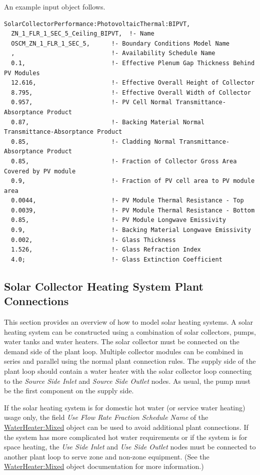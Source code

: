 An example input object follows.


\begin{lstlisting}
SolarCollectorPerformance:PhotovoltaicThermal:BIPVT,
  ZN_1_FLR_1_SEC_5_Ceiling_BIPVT,  !- Name
  OSCM_ZN_1_FLR_1_SEC_5,      !- Boundary Conditions Model Name
  ,                           !- Availability Schedule Name
  0.1,                        !- Effective Plenum Gap Thickness Behind PV Modules
  12.616,                     !- Effective Overall Height of Collector
  8.795,                      !- Effective Overall Width of Collector
  0.957,                      !- PV Cell Normal Transmittance-Absorptance Product
  0.87,                       !- Backing Material Normal Transmittance-Absorptance Product
  0.85,                       !- Cladding Normal Transmittance-Absorptance Product
  0.85,                       !- Fraction of Collector Gross Area Covered by PV module
  0.9,                        !- Fraction of PV cell area to PV module area
  0.0044,                     !- PV Module Thermal Resistance - Top
  0.0039,                     !- PV Module Thermal Resistance - Bottom
  0.85,                       !- PV Module Longwave Emissivity
  0.9,                        !- Backing Material Longwave Emissivity
  0.002,                      !- Glass Thickness
  1.526,                      !- Glass Refraction Index
  4.0;                        !- Glass Extinction Coefficient
\end{lstlisting}

\subsection{Solar Collector Heating System Plant Connections}\label{solar-collector-heating-system-plant-connections}

This section provides an overview of how to model solar heating systems. A solar heating system can be constructed using a combination of solar collectors, pumps, water tanks and water heaters. The solar collector must be connected on the demand side of the plant loop. Multiple collector modules can be combined in series and parallel using the normal plant connection rules. The supply side of the plant loop should contain a water heater with the solar collector loop connecting to the \emph{Source Side Inlet} and \emph{Source Side Outlet} nodes. As usual, the pump must be the first component on the supply side.

If the solar heating system is for domestic hot water (or service water heating) usage only, the field \emph{Use Flow Rate Fraction Schedule Name} of the \hyperref[waterheatermixed]{WaterHeater:Mixed} object can be used to avoid additional plant connections. If the system has more complicated hot water requirements or if the system is for space heating, the \emph{Use Side Inlet} and \emph{Use Side Outlet} nodes must be connected to another plant loop to serve zone and non-zone equipment. (See the \hyperref[waterheatermixed]{WaterHeater:Mixed} object documentation for more information.)

